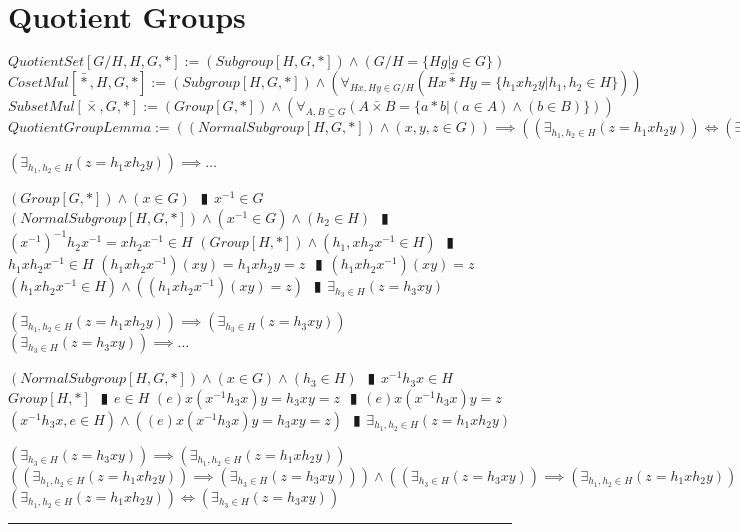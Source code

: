 \documentclass{book}
\newcommand{\abr}{:=}
\newcommand{\pipe}{$\phantom{(}\vrectangleblack\phantom{)}$}
\newcommand{\pr}[1]{\left(#1\right)}
\newcommand{\bbin}[1]{\mathbin{{\bar{#1}}}}
\begin{document}
\section{Quotient Groups}
$QuotientSet[G / H, H, G, *] \abr (Subgroup[H, G, *]) \land (G / H = \{H g | g \in G\})$ \\
$CosetMul[\bbin{*}, H, G, *] \abr (Subgroup[H, G, *]) \land \pr{\forall_{H x, H y \in G / H}(H x \bbin{*} H y = \{h_1 x h_2 y | h_1, h_2 \in H\})}$ \\
$SubsetMul[\bbin{\times}, G, *] \abr (Group[G, *]) \land \pr{\forall_{A, B \subseteq G}\pr{A \bbin{\times} B = \{a * b | (a \in A) \land (b \in B)\}}}$ \\

$QuotientGroupLemma \abr \pr{(NormalSubgroup[H, G, *]) \land (x, y, z \in G)} \implies \pr{\pr{\exists_{h_1, h_2 \in H}(z = h_1 x h_2 y)} \iff \pr{\exists_{h_3 \in H}(z = h_3 x y)}}$
\begin{enumerate}
  \lit $\pr{\exists_{h_1, h_2 \in H}(z = h_1 x h_2 y)} \implies \ldots$
  \begin{enumerate}
    \lit $(Group[G, *]) \land (x \in G)$ \pipe $x^{-1} \in G$
    \lit $(NormalSubgroup[H, G, *]) \land (x^{-1} \in G) \land (h_2 \in H)$ \pipe $(x^{-1})^{-1} h_2 x^{-1} = x h_2 x^{-1} \in H$
    \lit $(Group[H, *]) \land (h_1, x h_2 x^{-1} \in H)$ \pipe $h_1 x h_2 x^{-1} \in H$
    \lit $(h_1 x h_2 x^{-1}) (x y) = h_1 x h_2 y = z$ \pipe $(h_1 x h_2 x^{-1}) (x y) = z$
    \lit $(h_1 x h_2 x^{-1} \in H) \land \pr{(h_1 x h_2 x^{-1}) (x y) = z}$ \pipe $\exists_{h_3 \in H}(z = h_3 x y)$
  \end{enumerate}
  \lit $\pr{\exists_{h_1, h_2 \in H}(z = h_1 x h_2 y)} \implies \pr{\exists_{h_3 \in H}(z = h_3 x y)}$
  \lit $\pr{\exists_{h_3 \in H}(z = h_3 x y)} \implies \ldots$
  \begin{enumerate}
    \lit $(NormalSubgroup[H, G, *]) \land (x \in G) \land (h_3 \in H)$ \pipe $x^{-1} h_3 x \in H$
    \lit $Group[H, *]$ \pipe $e \in H$
    \lit $(e) x (x^{-1} h_3 x) y = h_3 x y = z$ \pipe $(e) x (x^{-1} h_3 x) y = z$
    \lit $(x^{-1} h_3 x, e \in H) \land \pr{(e) x (x^{-1} h_3 x) y = h_3 x y = z}$ \pipe $\exists_{h_1, h_2 \in H}(z = h_1 x h_2 y)$
  \end{enumerate}
  \lit $\pr{\exists_{h_3 \in H}(z = h_3 x y)} \implies \pr{\exists_{h_1, h_2 \in H}(z = h_1 x h_2 y)}$
  \lit $\pr{\pr{\exists_{h_1, h_2 \in H}(z = h_1 x h_2 y)} \implies \pr{\exists_{h_3 \in H}(z = h_3 x y)}} \land \pr{\pr{\exists_{h_3 \in H}(z = h_3 x y)} \implies \pr{\exists_{h_1, h_2 \in H}(z = h_1 x h_2 y)}}$
  \lit $\pr{\exists_{h_1, h_2 \in H}(z = h_1 x h_2 y)} \iff \pr{\exists_{h_3 \in H}(z = h_3 x y)}$
\end{enumerate} \vspace{.75mm} \hrule \vspace{.75mm} \ \\ 
\end{document}
